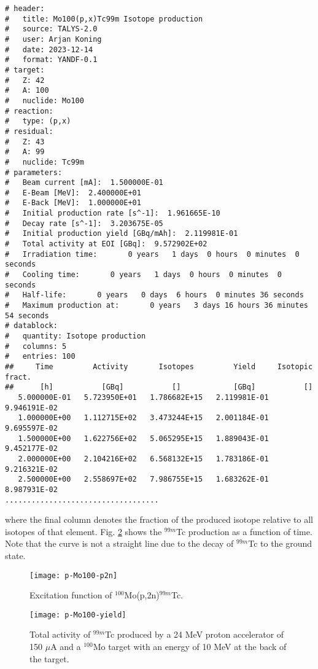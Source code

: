 \begin{samplecase}
{\begin{verbatim}
# header:
#   title: Mo100(p,x)Tc99m Isotope production
#   source: TALYS-2.0
#   user: Arjan Koning
#   date: 2023-12-14
#   format: YANDF-0.1
# target:
#   Z: 42
#   A: 100
#   nuclide: Mo100
# reaction:
#   type: (p,x)
# residual:
#   Z: 43
#   A: 99
#   nuclide: Tc99m
# parameters:
#   Beam current [mA]:  1.500000E-01
#   E-Beam [MeV]:  2.400000E+01
#   E-Back [MeV]:  1.000000E+01
#   Initial production rate [s^-1]:  1.961665E-10
#   Decay rate [s^-1]:  3.203675E-05
#   Initial production yield [GBq/mAh]:  2.119981E-01
#   Total activity at EOI [GBq]:  9.572902E+02
#   Irradiation time:       0 years   1 days  0 hours  0 minutes  0 seconds
#   Cooling time:       0 years   1 days  0 hours  0 minutes  0 seconds
#   Half-life:       0 years   0 days  6 hours  0 minutes 36 seconds
#   Maximum production at:       0 years   3 days 16 hours 36 minutes 54 seconds
# datablock:
#   quantity: Isotope production
#   columns: 5
#   entries: 100
##     Time         Activity       Isotopes         Yield     Isotopic fract.
##      [h]           [GBq]           []            [GBq]           []
   5.000000E-01   5.723950E+01   1.786682E+15   2.119981E-01   9.946191E-02
   1.000000E+00   1.112715E+02   3.473244E+15   2.001184E-01   9.695597E-02
   1.500000E+00   1.622756E+02   5.065295E+15   1.889043E-01   9.452177E-02
   2.000000E+00   2.104216E+02   6.568132E+15   1.783186E-01   9.216321E-02
   2.500000E+00   2.558697E+02   7.986755E+15   1.683262E-01   8.987931E-02
...................................
\end{verbatim} } \renewcommand{\baselinestretch}{1.07}\small\normalsize
\noindent
where the final column denotes the fraction of the produced isotope relative to all 
isotopes of that element. Fig. \ref{tc99m} shows the $^{99m}$Tc production as a function of time.
Note that the curve is not  a straight line due to the decay of $^{99m}$Tc to 
the ground state.
\end{samplecase}
\begin{figure}
\centering\texttt{[image: p-Mo100-p2n]}
\caption{Excitation function of $^{100}$Mo(p,2n)$^{99m}$Tc.}
\label{tc99mcross}
\end{figure}
\begin{figure}
\centering\texttt{[image: p-Mo100-yield]}
\caption{Total activity of $^{99m}$Tc produced by a 24 MeV proton accelerator of 
150 $\mu$A and a $^{100}$Mo target with an energy of 10 MeV at the back of the 
target.}
\label{tc99m}
\end{figure}
